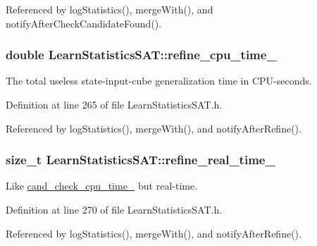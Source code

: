 Referenced by log\-Statistics(), merge\-With(), and notify\-After\-Check\-Candidate\-Found().

\hypertarget{classLearnStatisticsSAT_ad50f0623e605d349f3221f9e1332805d}{
\subsubsection[{refine\-\_\-cpu\-\_\-time\-\_\-}]{\setlength{\rightskip}{0pt plus 5cm}double Learn\-Statistics\-S\-A\-T\-::refine\-\_\-cpu\-\_\-time\-\_\-\hspace{0.3cm}{\ttfamily [protected]}}}\label{classLearnStatisticsSAT_ad50f0623e605d349f3221f9e1332805d}


The total useless state-\/input-\/cube generalization time in C\-P\-U-\/seconds. 



Definition at line 265 of file Learn\-Statistics\-S\-A\-T.\-h.



Referenced by log\-Statistics(), merge\-With(), and notify\-After\-Refine().

\hypertarget{classLearnStatisticsSAT_aa36efa6b1b2bfef8ca65095952c5c35e}{
\subsubsection[{refine\-\_\-real\-\_\-time\-\_\-}]{\setlength{\rightskip}{0pt plus 5cm}size\-\_\-t Learn\-Statistics\-S\-A\-T\-::refine\-\_\-real\-\_\-time\-\_\-\hspace{0.3cm}{\ttfamily [protected]}}}\label{classLearnStatisticsSAT_aa36efa6b1b2bfef8ca65095952c5c35e}


Like \hyperlink{classLearnStatisticsSAT_a2ab5cd522b7a4d700a11c0bb430baa81}{cand\-\_\-check\-\_\-cpu\-\_\-time\-\_\-} but real-\/time. 



Definition at line 270 of file Learn\-Statistics\-S\-A\-T.\-h.



Referenced by log\-Statistics(), merge\-With(), and notify\-After\-Refine().

